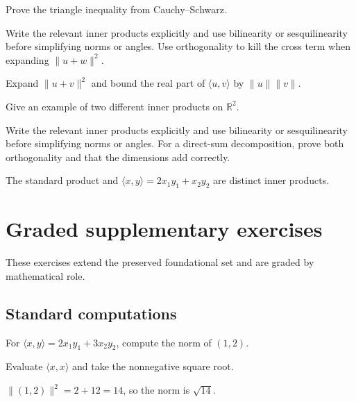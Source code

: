 \begin{exercise}\label{exr:i13-07}
Prove the triangle inequality from Cauchy–Schwarz.
\end{exercise}
\begin{hint}
Write the relevant inner products explicitly and use bilinearity or sesquilinearity before simplifying norms or angles. Use orthogonality to kill the cross term when expanding \(\|u+w\|^2\).
\end{hint}
\begin{solution}
Expand $\|u+v\|^2$ and bound the real part of $\langle u,v\rangle$ by $\|u\|\|v\|$.
\end{solution}

\begin{exercise}\label{exr:i13-08}
Give an example of two different inner products on $\mathbb R^2$.
\end{exercise}
\begin{hint}
Write the relevant inner products explicitly and use bilinearity or sesquilinearity before simplifying norms or angles. For a direct-sum decomposition, prove both orthogonality and that the dimensions add correctly.
\end{hint}
\begin{solution}
The standard product and $\langle x,y\rangle=2x_1y_1+x_2y_2$ are distinct inner products.
\end{solution}


\section{Graded supplementary exercises}
These exercises extend the preserved foundational set and are graded by mathematical role.

\subsection*{Standard computations}

\begin{exercise}\label{exr:i13-expand-01}
For \(\langle x,y\rangle=2x_1y_1+3x_2y_2\), compute the norm of \((1,2)\).
\end{exercise}
\begin{hint}
Evaluate \(\langle x,x\rangle\) and take the nonnegative square root.
\end{hint}
\begin{solution}
\(\|(1,2)\|^2=2+12=14\), so the norm is \(\sqrt{14}\).
\end{solution}

